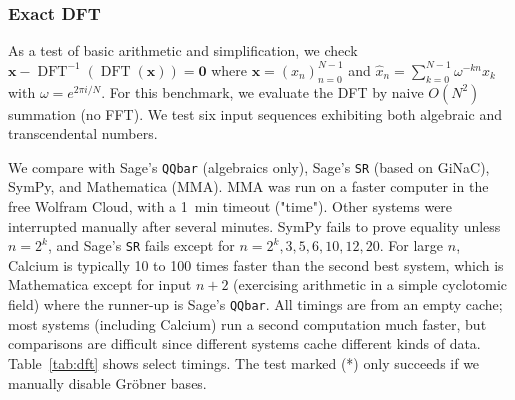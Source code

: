 \documentclass[sigconf,screen,urlbreakonhyphens]{acmart}
\begin{document}
\subsubsection{Exact DFT}

As a test of basic arithmetic and simplification,
we check $\textbf{x} - \operatorname{DFT}^{-1}(\operatorname{DFT}(\textbf{x})) = \textbf{0}$
where $\textbf{x} = (x_n)_{n=0}^{N-1}$ and $\hat x_n = \sum_{k=0}^{N-1} \omega^{-kn} x_k$
with $\omega = e^{2 \pi i / N}$. For this benchmark, we evaluate
the DFT by naive $O(N^2)$ summation (no FFT).
We test six input sequences exhibiting both algebraic and transcendental numbers.

We compare with Sage's \texttt{QQbar} (algebraics only), Sage's \texttt{SR} (based on GiNaC),
SymPy, and Mathematica (MMA). MMA was run on a faster computer in the free Wolfram Cloud, with a 1~min timeout
("time"). Other systems were interrupted manually after several minutes.
SymPy fails to prove equality unless $n = 2^k$, and Sage's \texttt{SR} fails except for $n = 2^k, 3, 5, 6, 10, 12, 20$.
For large $n$, Calcium is typically 10 to 100 times faster than the second
best system, which is Mathematica except for input $n+2$ (exercising arithmetic in a simple cyclotomic field) where
the runner-up is Sage's \texttt{QQbar}.
All timings are from an empty cache;
most systems (including Calcium) run a second computation much faster,
but comparisons are difficult since
different systems cache different kinds of data.
Table~\ref{tab:dft} shows select timings.
The test marked (*) only succeeds if we manually disable Gr\"{o}bner bases.
\end{document}
